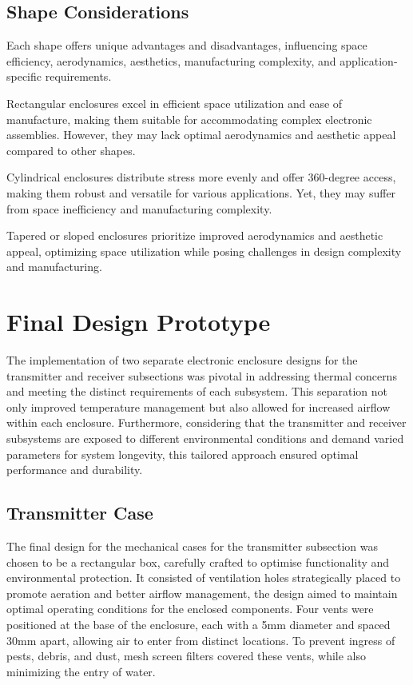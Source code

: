 \documentclass[class=report,11pt,crop=false]{standalone}
\begin{document}
\subsection{Shape Considerations}
Each shape offers unique advantages and disadvantages, influencing space efficiency, aerodynamics, aesthetics, manufacturing complexity, and application-specific requirements.
\newline

Rectangular enclosures excel in efficient space utilization and ease of manufacture, making them suitable for accommodating complex electronic assemblies. However, they may lack optimal aerodynamics and aesthetic appeal compared to other shapes.
\newline

Cylindrical enclosures distribute stress more evenly and offer 360-degree access, making them robust and versatile for various applications. Yet, they may suffer from space inefficiency and manufacturing complexity.
\newline

Tapered or sloped enclosures prioritize improved aerodynamics and aesthetic appeal, optimizing space utilization while posing challenges in design complexity and manufacturing.


\section{Final Design Prototype}
The implementation of two separate electronic enclosure designs for the transmitter and receiver subsections was pivotal in addressing thermal concerns and meeting the distinct requirements of each subsystem. This separation not only improved temperature management but also allowed for increased airflow within each enclosure. Furthermore, considering that the transmitter and receiver subsystems are exposed to different environmental conditions and demand varied parameters for system longevity, this tailored approach ensured optimal performance and durability.
\newline

\subsection{Transmitter Case}
The final design for the mechanical cases for the transmitter subsection was chosen to be a rectangular box, carefully crafted to optimise functionality and environmental protection. It consisted of ventilation holes strategically placed to promote aeration and better airflow management, the design aimed to maintain optimal operating conditions for the enclosed components. Four vents were positioned at the base of the enclosure, each with a 5mm diameter and spaced 30mm apart, allowing air to enter from distinct locations. To prevent ingress of pests, debris, and dust, mesh screen filters covered these vents, while also minimizing the entry of water.
\newline
\end{document}
